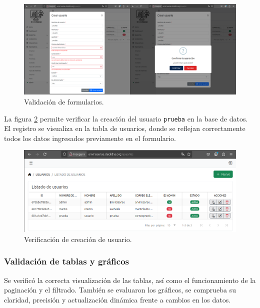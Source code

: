 \begin{figure}[H]
    \centering
    \includegraphics[width=\textwidth]{Images/44_formulario.png}
    \caption[Validación de formularios]{Validación de formularios.}
    \label{fig:formulario}
\end{figure}

La figura \ref{fig:verificacion_formulario} permite verificar la creación del
usuario \texttt{prueba} en la base de datos. El registro se visualiza en la
tabla de usuarios, donde se reflejan correctamente todos los datos ingresados
previamente en el formulario.

\begin{figure}[H]
    \centering
    \includegraphics[width=\textwidth]{Images/44_formulario_verificacion.png}
    \caption[Verificación de creación de usuario]{Verificación de creación de usuario.}
    \label{fig:verificacion_formulario}
\end{figure}

\subsubsection{Validación de tablas y gráficos}

Se verificó la correcta visualización de las tablas, así como el funcionamiento
de la paginación y el filtrado. También se evaluaron los gráficos, se comprueba
su claridad, precisión y actualización dinámica frente a cambios en los datos.

